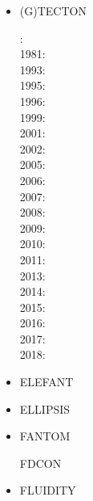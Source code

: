 \begin{itemize}
\item (G)TECTON

: \cite{mera80}\\
1981: \cite{mera81}\\
1993: \cite{gowo93}\\
1995: \cite{gowo95}\\
1996: \cite{guez96}\cite{gisb96}\\
1999: \cite{gowo99}\cite{fugo99}\\
2001: \cite{bugw01}\cite{gome01}\\
2002: \cite{bugw02}\\
2005: \cite{gowo05}\cite{vanw05}\cite{vabl05}\cite{gowo05}\\
2006: \cite{degw06}\cite{libi06}\cite{scdm06}\\
2007: \cite{vabl07}\\
2008: \cite{degw08}\cite{degw08b}\\
2009: \cite{ladg09}\cite{plmg09}\\
2010: \cite{vago10}\\
2011: \cite{bagw11}\cite{bagw11b}\\
2013: \cite{plab13}\\
2014: \cite{vagw14}\\
2015: \cite{mags15}\cite{nigo15}\\
2016: \cite{gemg16}\cite{masg16}\\
2017: \cite{ozgw17}\\
2018: \cite{gofv18}\cite{nigw18}

\item ELEFANT

\cite{tosn15}
\cite{matv15}
\cite{busa16}
\cite{latb17}
\cite{thie17}
\cite{pltv18}
\cite{wohu19}

\item ELLIPSIS

\cite{modm03}
\cite{omma06} 
\cite{moql07}
\cite{dyrm07}
\cite{onlg08}
\cite{pyeg10}
\cite{legu11}
\cite{lega12}
\cite{recf14}


\item FANTOM

\cite{thie11}
\cite{alht11}
\cite{alht12}
\cite{alhf13}
\cite{erhv14}
\cite{thsh14}
\cite{erhv15}
\cite{erhv19}

\index FDCON

\cite{enbs05}
\cite{fusc13}
\cite{fuks15}


\item FLUIDITY
\cite{dawk11}
\cite{gagd14}


\end{itemize}
